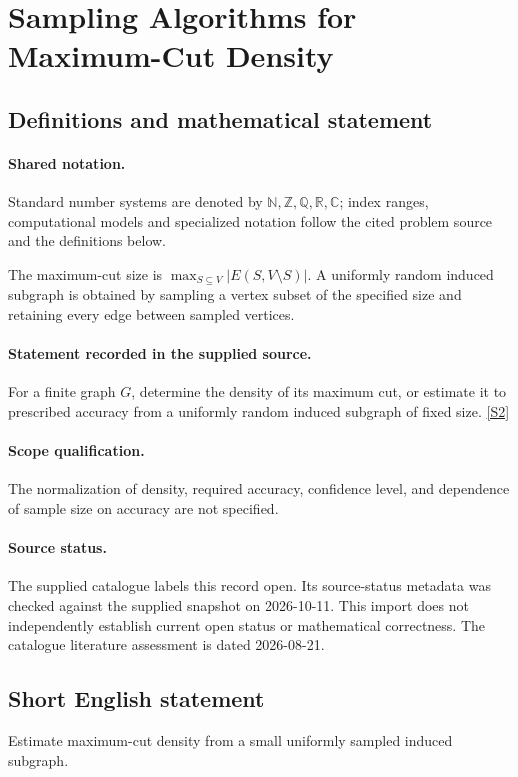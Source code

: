 \documentclass[11pt]{article}
\newcommand{\sref}[2]{\hyperlink{source:#1:#2}{[S#2]}}
\begin{document}
\section{Sampling Algorithms for Maximum-Cut Density}\label{statement}

\subsection{Definitions and mathematical statement}

\paragraph{Shared notation.}Standard number systems are denoted by $\mathbb N,\mathbb Z,\mathbb Q,\mathbb R,\mathbb C$; index ranges, computational models and specialized notation follow the cited problem source and the definitions below.


The maximum-cut size is $\max_{S\subseteq V}|E(S,V\setminus S)|$. A uniformly random induced subgraph is obtained by sampling a vertex subset of the specified size and retaining every edge between sampled vertices.
\paragraph{Statement recorded in the supplied source.}
For a finite graph $G$, determine the density of its maximum cut, or estimate it to prescribed accuracy from a uniformly random induced subgraph of fixed size. \sref{statement}{2}
\paragraph{Scope qualification.}
The normalization of density, required accuracy, confidence level, and dependence of sample size on accuracy are not specified.
\paragraph{Source status.}
The supplied catalogue labels this record open. Its source-status metadata was checked against the supplied snapshot on 2026-10-11. This import does not independently establish current open status or mathematical correctness. The catalogue literature assessment is dated 2026-08-21.
\subsection{Short English statement}
Estimate maximum-cut density from a small uniformly sampled induced subgraph.
\end{document}
